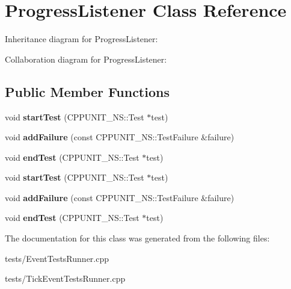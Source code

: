 \hypertarget{classProgressListener}{}\section{Progress\+Listener Class Reference}
\label{classProgressListener}


Inheritance diagram for Progress\+Listener\+:


Collaboration diagram for Progress\+Listener\+:
\subsection*{Public Member Functions}
\begin{DoxyCompactItemize}
\item 
void {\bfseries start\+Test} (C\+P\+P\+U\+N\+I\+T\+\_\+\+N\+S\+::\+Test $\ast$test)\hypertarget{classProgressListener_a6546ed5a9e71c492c2e774cabee443c3}{}\label{classProgressListener_a6546ed5a9e71c492c2e774cabee443c3}

\item 
void {\bfseries add\+Failure} (const C\+P\+P\+U\+N\+I\+T\+\_\+\+N\+S\+::\+Test\+Failure \&failure)\hypertarget{classProgressListener_afccc7593057ac88529f0d46eb783d45b}{}\label{classProgressListener_afccc7593057ac88529f0d46eb783d45b}

\item 
void {\bfseries end\+Test} (C\+P\+P\+U\+N\+I\+T\+\_\+\+N\+S\+::\+Test $\ast$test)\hypertarget{classProgressListener_a12232b9e94b43fbf161db1b6fbac75c7}{}\label{classProgressListener_a12232b9e94b43fbf161db1b6fbac75c7}

\item 
void {\bfseries start\+Test} (C\+P\+P\+U\+N\+I\+T\+\_\+\+N\+S\+::\+Test $\ast$test)\hypertarget{classProgressListener_a6546ed5a9e71c492c2e774cabee443c3}{}\label{classProgressListener_a6546ed5a9e71c492c2e774cabee443c3}

\item 
void {\bfseries add\+Failure} (const C\+P\+P\+U\+N\+I\+T\+\_\+\+N\+S\+::\+Test\+Failure \&failure)\hypertarget{classProgressListener_afccc7593057ac88529f0d46eb783d45b}{}\label{classProgressListener_afccc7593057ac88529f0d46eb783d45b}

\item 
void {\bfseries end\+Test} (C\+P\+P\+U\+N\+I\+T\+\_\+\+N\+S\+::\+Test $\ast$test)\hypertarget{classProgressListener_a12232b9e94b43fbf161db1b6fbac75c7}{}\label{classProgressListener_a12232b9e94b43fbf161db1b6fbac75c7}

\end{DoxyCompactItemize}


The documentation for this class was generated from the following files\+:\begin{DoxyCompactItemize}
\item 
tests/Event\+Tests\+Runner.\+cpp\item 
tests/Tick\+Event\+Tests\+Runner.\+cpp\end{DoxyCompactItemize}
